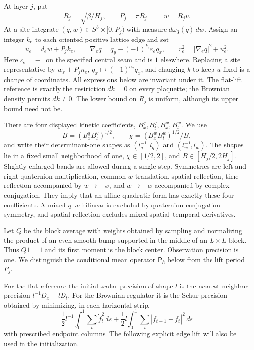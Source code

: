 At layer $j$, put
\[
 R_j=\sqrt{\beta/H_j},\qquad P_j=\pi R_j,\qquad w=R_jv.
\]
At a site integrate $(q,w)\in S^3\times[0,P_j)$ with measure
$d\omega_3(q)\,dw$.  Assign an integer $k_e$ to each oriented positive
lattice edge and set
\[
 u_e=d_ew+P_jk_e,
 \qquad \nabla_eq=q_y-(-1)^{k_e}\varepsilon_eq_x,
 \qquad r_e^2=|\nabla_eq|^2+u_e^2.
\]
Here $\varepsilon_e=-1$ on the specified central seam and is $1$
elsewhere.  Replacing a site representative by $w_x+P_jn_x$,
$q_x\mapsto(-1)^{n_x}q_x$, and changing $k$ to keep $u$ fixed is a change
of coordinates.  All expressions below are invariant under it.  The
flat-lift reference is exactly the restriction $dk=0$ on every
plaquette; the Brownian density permits $dk\ne0$.  The lower bound on
$R_j$ is uniform, although its upper bound need not be.

There are four displayed kinetic coefficients,
$B_x^q,B_t^q,B_x^w,B_t^w$.  We use
\[
 B=(B_x^qB_t^q)^{1/2},\qquad
 \chi=(B_x^wB_t^w)^{1/2}/B,
\]
and write their determinant-one shapes as $(l_q^{-1},l_q)$ and
$(l_w^{-1},l_w)$.  The shapes lie in a fixed small neighborhood of one,
$\chi\in[1/2,2]$, and $B\in[H_j/2,2H_j]$.  Slightly enlarged bands are
allowed during a single step.  Symmetries are left and right quaternion
multiplication, common $w$ translation, spatial reflection, time
reflection accompanied by $w\mapsto-w$, and $w\mapsto-w$ accompanied by
complex conjugation.  They imply that an affine quadratic form has
exactly these four coefficients.  A mixed $q$--$w$ bilinear is excluded
by quaternion conjugation symmetry, and spatial reflection excludes
mixed spatial--temporal derivatives.

Let $Q$ be the block average with weights obtained by sampling and
normalizing the product of an even smooth bump supported in the middle
of an $L\times L$ block.  Thus $Q1=1$ and its first moment is the block
center.  Observation precision is one.  We distinguish the conditional
mean operator $\mathsf P_h$ below from the lift period $P_j$.

For the flat reference the initial scalar precision of shape $l$ is the
nearest-neighbor precision $l^{-1}D_x+lD_t$.  For the Brownian regulator
it is the Schur precision obtained by minimizing, in each horizontal
strip,
\[
 \frac12l^{-1}\int_0^1\sum_t\dot f_t^2\,ds
       +\frac12l\int_0^1\sum_t|f_{t+1}-f_t|^2\,ds
\]
with prescribed endpoint columns.  The following explicit edge lift
will also be used in the initialization.

